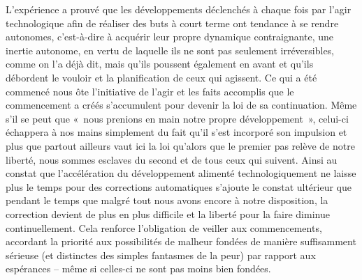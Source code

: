 
{L'expérience a prouvé que les développements déclenchés à chaque fois
par l'agir technologique afin de réaliser des buts à court terme ont
tendance à se rendre autonomes, c'est-à-dire à acquérir leur propre
dynamique contraignante, une inertie autonome, en vertu de laquelle
ils ne sont pas seulement irréversibles, comme on l'a déjà dit, mais
qu'ils poussent également en avant et qu'ils débordent le vouloir et
la planification de ceux qui agissent. Ce qui a été commencé nous ôte
l'initiative de l'agir et les faits accomplis que le commencement a
créés s'accumulent pour devenir la loi de sa continuation. Même s'il
se peut que «~nous prenions en main notre propre développement~»,
celui-ci échappera à nos mains simplement du fait qu'il s'est
incorporé son impulsion et plus que partout ailleurs vaut ici la loi
qu'alors que le premier pas relève de notre liberté, nous sommes
esclaves du second et de tous ceux qui suivent. Ainsi au constat que
l'accélération du développement alimenté technologiquement ne laisse
plus le temps pour des corrections automatiques s'ajoute le constat
ultérieur que pendant le temps que malgré tout nous avons encore à
notre disposition, la correction devient de plus en plus difficile et
la liberté pour la faire diminue continuellement. Cela renforce
l'obligation de veiller aux commencements, accordant la priorité aux
possibilités de malheur fondées de manière suffisamment sérieuse (et
distinctes des simples fantasmes de la peur) par rapport aux
espérances – même si celles-ci ne sont pas moins bien fondées.
}



